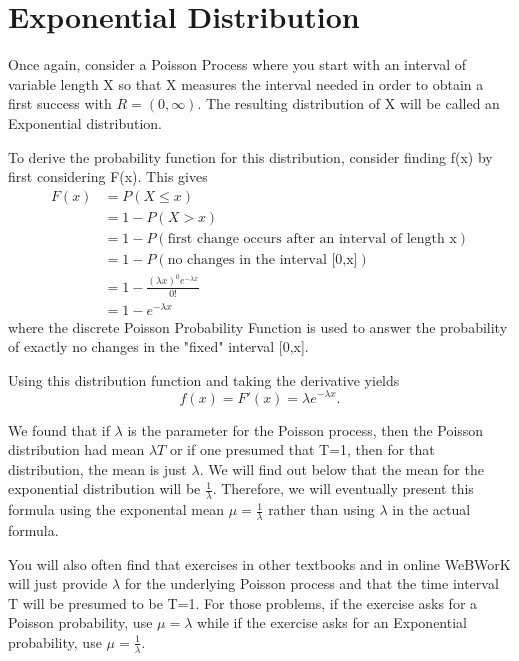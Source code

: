 \documentclass[10pt,]{book}
\numberwithin{equation}{section}
\newcommand{\gt}{>}
\begin{document}
\section[{Exponential Distribution}]{Exponential Distribution}\label{section-53}
\hypertarget{p-1076}{}%
Once again, consider a Poisson Process where you start with an interval of variable length X so that X measures the interval needed in order to obtain a first success with \(R = (0,\infty)\). The resulting distribution of X will be called an Exponential distribution.%
\par
\hypertarget{p-1077}{}%
To derive the probability function for this distribution, consider finding f(x) by first considering F(x). This gives%
\begin{align*}
F(x)&  = P(X \le x)\\
& = 1 - P(X \gt x)\\
& = 1 - P(\text{first change occurs after an interval of length x})\\
& = 1 - P(\text{no changes in the interval [0,x]})\\
& = 1 - \frac{(\lambda x)^0 e^{-\lambda x}}{0!}\\
& = 1 - e^{-\lambda x}
\end{align*}
where the discrete Poisson Probability Function is used to answer the probability of exactly no changes in the "fixed" interval [0,x].%
\par
\hypertarget{p-1078}{}%
Using this distribution function and taking the derivative yields%
\begin{equation*}
f(x) = F'(x) = \lambda e^{-\lambda x}.
\end{equation*}
%
\par
\hypertarget{p-1079}{}%
We found that if \(\lambda\) is the parameter for the Poisson process, then the Poisson distribution had mean \(\lambda T\) or if one presumed that T=1, then for that distribution, the mean is just \(\lambda\).  We will find out below that the mean for the exponential distribution will be \(\frac{1}{\lambda}\). Therefore, we will eventually present this formula using the exponental mean \(\mu = \frac{1}{\lambda}\) rather than using \(\lambda\) in the actual formula.%
\par
\hypertarget{p-1080}{}%
You will also often find that exercises in other textbooks and in online WeBWorK will just provide \(\lambda\) for the underlying Poisson process and that the time interval T will be presumed to be T=1.  For those problems, if the exercise asks for a Poisson probability, use \(\mu = \lambda\) while if the exercise asks for an Exponential probability, use \(\mu = \frac{1}{\lambda}\).%
\end{document}
